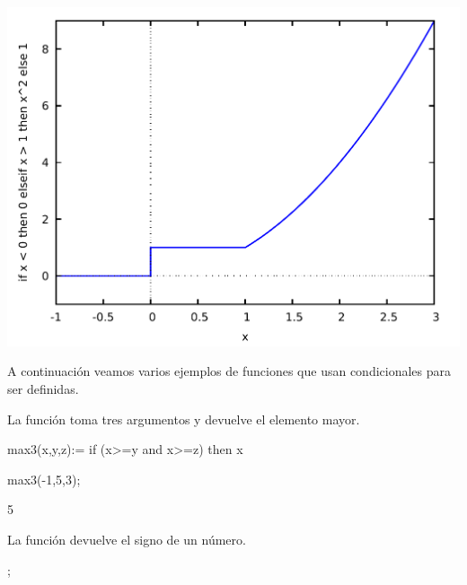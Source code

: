 \begin{maximat}
	\begin{center}
		\includegraphics[scale=.5]{plot_G2.pdf}
	\end{center}
\end{maximat}

A continuación veamos varios ejemplos de funciones que usan
condicionales para ser definidas.

La función  toma tres argumentos y devuelve
el elemento mayor.

\begin{maximai}
	max3(x,y,z):= if (x>=y and x>=z) then x
\end{maximai}

\begin{maximai}
	max3(-1,5,3);
\end{maximai}
\begin{maximao}
	5
\end{maximao}

La función  devuelve el signo de un número.


\begin{maximai}
;
\end{maximai}
\begin{maximao}
\left[ 1 , -1 , 0 \right] 
\end{maximao}
